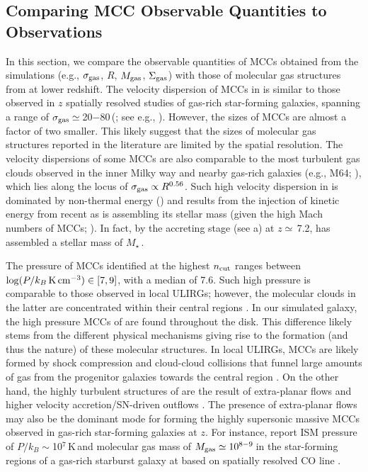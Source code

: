 \IfFileExists{emulateapjlegacy.cls}{\documentclass[iop]{emulateapjlegacy}}{\documentclass[iop]{emulateapj}}
\begin{document}
\subsection{Comparing MCC Observable Quantities to Observations} \label{sec:diss1}

In this section, we compare the observable quantities of MCCs obtained from the simulations (e.g., $\sigma_{\rm gas}$, $R$, $M_{\rm gas}$, $\Sigma_{\rm gas}$) with those of molecular gas structures from \obs at lower redshift.
The velocity dispersion of MCCs in \flower is similar to those observed in $z$ spatially resolved studies of gas-rich star-forming galaxies, 
spanning a range of $\sigma_{\rm gas}\simeq$\,20$-$80\,\kms (; see e.g., \citealt{Swinbank11a}). 
However, the sizes of MCCs are almost a factor of two smaller. This likely suggest that the sizes of \highz molecular gas structures reported in the literature
are limited by the spatial resolution. 
%
The velocity dispersions of some MCCs are also comparable to the most turbulent gas clouds observed in the inner Milky way and nearby gas-rich galaxies (e.g., M64; \citealt{Oka01a, Rosolowsky05a, Heyer09a, Leroy15a}), which lies along the locus of $\sigma_{\rm gas}\propto R^{0.56}$. Such high velocity dispersion 
in \flower is dominated by non-thermal energy () and results from the injection of kinetic energy from recent \SF as \flower is assembling its stellar mass (given the high Mach numbers of MCCs; ). In fact, by the accreting stage (see a) at $z\simeq$\,7.2, \flower has assembled a stellar mass of $M_\star$\,\Msun.

The pressure of MCCs identified at the highest $n_{\rm cut}$ ranges between $\log(P/k_B \,{\rm K}\,{\rm cm}^{-3})\in[7, 9]$, with a median of 7.6. Such high pressure is comparable to those observed in local ULIRGs; however, the molecular clouds in the latter are concentrated within their central regions \citep{Downes98a, Sakamoto08a}. In our simulated galaxy, the high pressure MCCs of \flower are found throughout the disk. This difference likely stems from the different physical mechanisms giving rise to the formation (and thus the nature) of these molecular structures.
%
In local ULIRGs, MCCs are likely formed by shock compression and cloud-cloud collisions that funnel large amounts of gas from the progenitor galaxies towards the central region \citep{Tan00a, Wu18a}. On the other hand, the highly turbulent structures of \flower are the result of extra-planar flows \citep{Kohandel19a} and higher velocity accretion/SN-driven outflows \citep{Gallerani18a}. The presence of extra-planar flows may also be the dominant mode for forming the highly supersonic massive MCCs observed in gas-rich star-forming galaxies at $z$. For instance, \citet{Swinbank11a} report ISM pressure of $P/k_B\sim$10$^7$\,K\,\cc and molecular gas mass of $M_{\rm gas}\simeq10^{8-9}$\,\Msun in the star-forming regions of a gas-rich starburst galaxy at \z{} based on spatially resolved CO line \obs.
\end{document}
